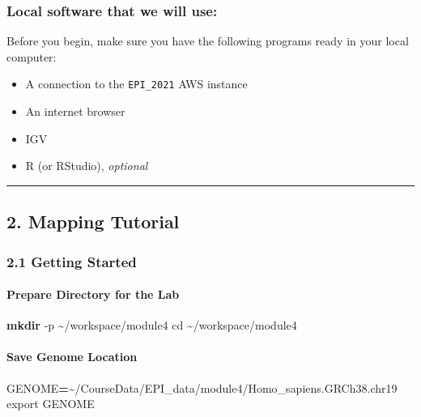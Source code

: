 \documentclass[
]{book}
\newenvironment{Shaded}{\begin{snugshade}}{\end{snugshade}}
\newcommand{\AttributeTok}[1]{\textcolor[rgb]{0.13,0.29,0.53}{#1}}
\newcommand{\BuiltInTok}[1]{#1}
\newcommand{\FunctionTok}[1]{\textcolor[rgb]{0.13,0.29,0.53}{\textbf{#1}}}
\newcommand{\NormalTok}[1]{#1}
\newcommand{\OperatorTok}[1]{\textcolor[rgb]{0.81,0.36,0.00}{\textbf{#1}}}
\newcommand{\VariableTok}[1]{\textcolor[rgb]{0.00,0.00,0.00}{#1}}
\providecommand{\tightlist}{%
  \setlength{\itemsep}{0pt}\setlength{\parskip}{0pt}}
\begin{document}
\subsubsection{Local software that we will use:}\label{local-software-that-we-will-use}

Before you begin, make sure you have the following programs ready in your local computer:

\begin{itemize}
\tightlist
\item
  A connection to the \texttt{EPI\_2021} AWS instance
\item
  An internet browser
\item
  IGV
\item
  R (or RStudio), \emph{optional}
\end{itemize}

\begin{center}\rule{0.5\linewidth}{0.5pt}\end{center}

\subsection{2. Mapping Tutorial}\label{mapping-tutorial}

\subsubsection{2.1 Getting Started}\label{getting-started}

\paragraph{Prepare Directory for the Lab}\label{prepare-directory-for-the-lab}

\begin{Shaded}
\begin{Highlighting}[]
\FunctionTok{mkdir} \AttributeTok{{-}p}\NormalTok{ \textasciitilde{}/workspace/module4}
\BuiltInTok{cd}\NormalTok{ \textasciitilde{}/workspace/module4}
\end{Highlighting}
\end{Shaded}

\paragraph{Save Genome Location}\label{save-genome-location}

\begin{Shaded}
\begin{Highlighting}[]
\VariableTok{GENOME}\OperatorTok{=}\NormalTok{\textasciitilde{}/CourseData/EPI\_data/module4/Homo\_sapiens.GRCh38.chr19}
\BuiltInTok{export} \VariableTok{GENOME}
\end{Highlighting}
\end{Shaded}
\end{document}
